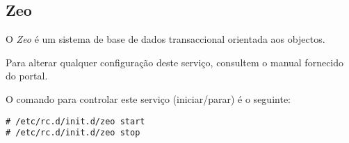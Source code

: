 \subsection{Zeo}

O \emph{Zeo} é um sistema de base de dados transaccional orientada aos objectos.

Para alterar qualquer configuração deste serviço, consultem o manual fornecido do portal.

O comando para controlar este serviço (iniciar/parar) é o seguinte:

\begin{Verbatim}[commandchars=\\\{\}]
# /etc/rc.d/init.d/zeo start
# /etc/rc.d/init.d/zeo stop
\end{Verbatim}

